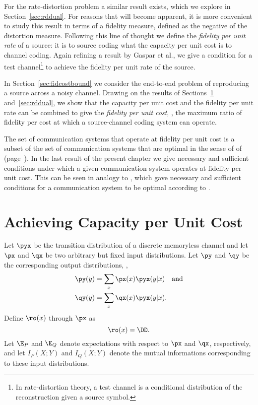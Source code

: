For the rate-distortion problem a similar result exists, which we explore in
Section~\ref{sec:rddual}. For reasons that will become apparent, it is more
convenient to study this result in terms of a fidelity measure, defined as the
negative of the distortion measure. Following this line of
thought we define the \emph{fidelity per unit rate} of a source:
it is to source coding what the capacity per unit cost is to channel coding.
Again refining a result by Gaspar et al., we give a condition for a test
channel\footnote{In rate-distortion theory, a test channel is a conditional
distribution of the reconstruction given a source symbol.}
to achieve the fidelity per unit rate of the source. 

In Section~\ref{sec:fidcostbound} we consider the end-to-end problem of
reproducing a source across a noisy channel. Drawing on the results of
Sections~\ref{sec:cuc} and~\ref{sec:rddual}, we show that the capacity per unit
cost and the fidelity per unit rate can be combined to give the \emph{fidelity
per unit cost}, \ie, the maximum ratio of fidelity per cost at which a
source-channel coding system can operate.

The set of communication systems that operate at fidelity per unit cost is a
subset of the set of communication systems that are optimal in the sense of
 of  (page~\pageref{def:optimality}).
In the last result of the present chapter we give necessary and sufficient
conditions under which a given communication  system operates at fidelity per
unit cost. This can be seen in analogy to , which
gave necessary and sufficient conditions for a communication system to be
optimal according to .


\section{Achieving Capacity per Unit Cost}
\label{sec:cuc}

Let $\pyx$ be the transition distribution of a discrete memoryless channel and
let $\px$ and $\qx$ be two arbitrary but fixed input distributions. Let $\py$
and $\qy$ be the corresponding output distributions, \ie, 
\begin{align*}
  \py(y) &= \sum_x \px(x) \pyx(y|x) \quad\text{and} \\
  \qy(y) &= \sum_x \qx(x) \pyx(y|x).
\end{align*}
Define $\ro(x)$ through $\px$ as
\begin{equation}
  \label{eq:optrho}
  \ro(x) = \DD.
\end{equation}
Let $\E_P$ and $\E_Q$ denote expectations with respect to $\px$ and $\qx$,
respectively, and let $I_P(X;Y)$ and $I_Q(X;Y)$ denote the mutual informations
corresponding to these input distributions. 

